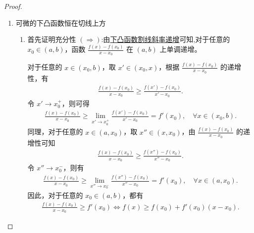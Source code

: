 \documentclass[../../main.tex]{subfiles}%
\begin{document}
\begin{proof}
\begin{enumerate}
\begin{enumerate}[(1)]
接下来证明必要性 $(\Leftarrow)$:
由已知条件可知，对于任意的 $x_1, x_2, x_3 \in I$ 且 $x_1 < x_2 < x_3$，都满足
\[
\frac{f(x_2) - f(x_1)}{x_2 - x_1} \leqslant \frac{f(x_3) - f(x_2)}{x_3 - x_2}.
\]
这等价于
\begin{align}
f(x_2) \leqslant \frac{x_2 - x_1}{x_3 - x_1} f(x_3) + \frac{x_3 - x_2}{x_3 - x_1} f(x_1). \label{157489418979}
\end{align}
进而，对于任意的 $x_1, x_3 \in I$ 且 $x_1 < x_3$，以及任意的 $\lambda \in [0, 1]$，令 $x_2 = \lambda x_1 + (1 - \lambda) x_3 \in (x_1, x_3)$，此时 $\lambda = \frac{x_3 - x_2}{x_3 - x_1}$。
于是，根据\eqref{157489418979}式可以得到
\begin{align*}
f(\lambda x_1 + (1 - \lambda) x_3) = f(x_2) 
\leqslant \frac{x_2 - x_1}{x_3 - x_1} f(x_3) + \frac{x_3 - x_2}{x_3 - x_1} f(x_1) 
= \lambda f(x_1) + (1 - \lambda) f(x_3).
\end{align*}
所以，函数 $f$ 在区间 $I$ 上下凸。

\item 显然(1)证明中的不等号可以全部改为严格不等号.
\end{enumerate}

\item {\heiti 可微的下凸函数恒在切线上方}\begin{enumerate}[(1)]
\item 首先证明充分性 $(\Rightarrow)$:由\hyperref[下凸函数割线斜率递增]{下凸函数割线斜率递增}可知,对于任意的 $x_0\in (a,b)$，函数 $\frac{f(x) - f(x_0)}{x - x_0}$ 在 $(a,b)$ 上单调递增。

对于任意的 $x\in (x_0,b)$，取 $x'\in (x_0,x)$，根据 $\frac{f(x) - f(x_0)}{x - x_0}$ 的递增性，有
\begin{align*}
\frac{f(x) - f(x_0)}{x - x_0} \geqslant \frac{f(x') - f(x_0)}{x' - x_0}.
\end{align*}
令 $x'\to x_0^+$，则可得
\begin{align*}
\frac{f(x) - f(x_0)}{x - x_0} \geqslant \lim_{x'\to x_0^+}\frac{f(x') - f(x_0)}{x' - x_0}=f'(x_0),\quad \forall x\in (x_0,b).
\end{align*}
同理，对于任意的 $x\in (a,x_0)$，取 $x''\in (x,x_0)$，由 $\frac{f(x) - f(x_0)}{x - x_0}$ 的递增性可知
\begin{align*}
\frac{f(x) - f(x_0)}{x - x_0} \geqslant \frac{f(x'') - f(x_0)}{x'' - x_0}.
\end{align*}
令 $x''\to x_0^-$，则有
\begin{align*}
\frac{f(x) - f(x_0)}{x - x_0} \geqslant \lim_{x''\to x_0^-}\frac{f(x'') - f(x_0)}{x'' - x_0}=f'(x_0),\quad \forall x\in (a,x_0).
\end{align*}
因此，对于任意的 $x_0\in (a,b)$，都有
\begin{align*}
\frac{f(x) - f(x_0)}{x - x_0} \geqslant f'(x_0) \Leftrightarrow f(x)\geqslant f(x_0)+f'(x_0)(x - x_0).
\end{align*}


\end{enumerate}
\end{enumerate}
\end{proof}
\end{document}
